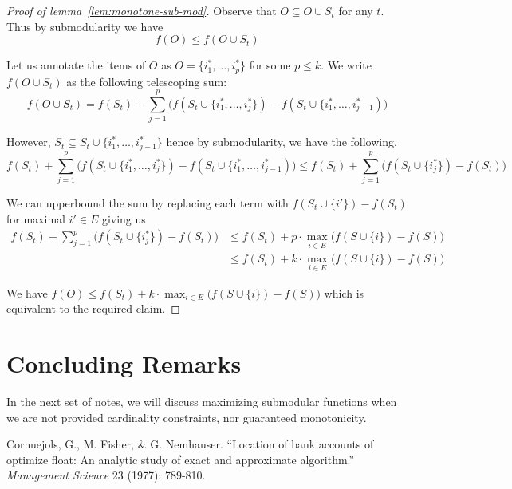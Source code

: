 \documentclass{article}
\begin{document}
\begin{proof}[Proof of lemma~\ref{lem:monotone-sub-mod}]
Observe that $O \subseteq O \cup S_t$ for any $t$. Thus by submodularity we have
\begin{equation*}
f(O) \leq f(O \cup S_t)
\end{equation*}

Let us annotate the items of $O$ as $O = \{ i_1^*, \ldots, i_p^* \}$ for some $p \leq k$. We write $f(O \cup S_t)$ as the following telescoping sum:
\begin{equation*}
f(O \cup S_t) = f(S_t) + \sum_{j=1}^p \Big( f(S_t \cup \{ i_1^*, \ldots, i_j^* \}) - f(S_t \cup \{ i_1^*, \ldots, i_{j-1}^*) \Big)
\end{equation*}

However, $S_t \subseteq S_t \cup \{ i_1^*, \ldots, i_{j-1}^* \}$ hence by submodularity, we have the following.
\begin{equation*}
f(S_t) + \sum_{j=1}^p \Big( f(S_t \cup \{ i_1^*, \ldots, i_j^* \}) - f(S_t \cup \{ i_1^*, \ldots, i_{j-1}^*) \Big)
\leq f(S_t) + \sum_{j=1}^p \Big( f(S_t \cup \{ i_j^* \} ) - f(S_t) \Big)
\end{equation*}

We can upperbound the sum by replacing each term with $f(S_t \cup \{ i' \}) - f(S_t)$ for maximal $i' \in E$ giving us
\begin{align*}
f(S_t) + \sum_{j=1}^p \Big( f(S_t \cup \{ i_j^* \} ) - f(S_t) \Big)
&\leq f(S_t) + p \cdot \max_{i \in E} \Big( f(S \cup \{ i \}) - f(S) \Big) \\
&\leq f(S_t) + k \cdot \max_{i \in E} \Big( f(S \cup \{ i \}) - f(S) \Big)
\end{align*}

We have $f(O)\leq f(S_t) + k \cdot \max_{i \in E} \big( f(S \cup \{ i \}) - f(S) \big)$ which is equivalent to the required claim.
\end{proof}

\section{Concluding Remarks}

In the next set of notes, we will discuss maximizing submodular functions when we are not provided cardinality constraints, nor guaranteed monotonicity.


\begin{thebibliography}{99}
Cornuejols, G., M. Fisher, \& G. Nemhauser. ``Location of bank accounts of optimize float: An analytic study of exact and approximate algorithm.'' \emph{Management Science} 23 (1977): 789-810.
\end{thebibliography}
\end{document}
